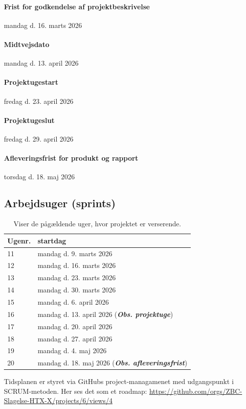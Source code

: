\documentclass[12pt, a4paper]{article}
\begin{document}
\paragraph{Frist for godkendelse af projektbeskrivelse} mandag d. 16. marts 2026
\paragraph{Midtvejsdato} mandag d. 13. april 2026
\paragraph{Projektugestart} fredag d. 23. april 2026
\paragraph{Projektugeslut} fredag d. 29. april 2026
\paragraph{Afleveringsfrist for produkt og rapport} torsdag d. 18. maj 2026
\subsection*{Arbejdsuger (sprints)}
\begin{table}[H]
  \centering
  \begin{tabular}{ll}
    \toprule
    Ugenr. & startdag \\
    \midrule 
    11 & mandag d. 9. marts 2026 \\
    12 & mandag d. 16. marts 2026 \\
    13 & mandag d. 23. marts 2026 \\
    14 & mandag d. 30. marts 2026 \\
    15 & mandag d. 6. april 2026 \\
    16 & mandag d. 13. april 2026  (\textit{\textbf{Obs. projektuge}}) \\
    17 & mandag d. 20. april 2026 \\
    18 & mandag d. 27. april 2026 \\
    19 & mandag d. 4. maj 2026 \\
    20 & mandag d. 18. maj 2026 (\textit{\textbf{Obs. afleveringsfrist}}) \\
    \bottomrule
  \end{tabular}\caption{Viser de pågældende uger, hvor projektet er verserende.}
\end{table}

Tidsplanen er styret via GitHubs project-managamenet med udgangspunkt i SCRUM-metoden. Her ses det som et roadmap: \url{https://github.com/orgs/ZBC-Slagelse-HTX-X/projects/6/views/4}
\end{document}
